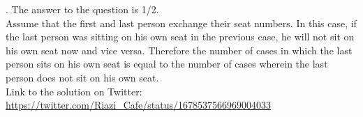 \begin{solution}.
The answer to the question is 1/2.\\[0.2cm]

Assume that the first and last person exchange their seat numbers. In this case, if the last person was sitting on his own seat in the previous case, he will not sit on his own seat now and vice versa. Therefore the number of cases in which the last person sits on his own seat is equal to the number of cases wherein the last person does not sit on his own seat.\\[0.2cm]

Link to the solution on Twitter:  \url{https://twitter.com/Riazi_Cafe/status/1678537566969004033}\end{solution}